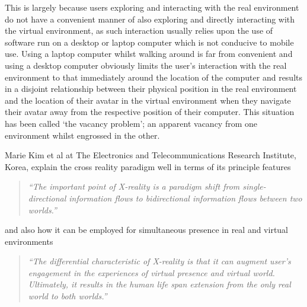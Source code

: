 This is largely because users exploring and interacting with the real environment do not have a convenient manner of also exploring and directly interacting with the virtual environment, as such interaction usually relies upon the use of software run on a desktop or laptop computer which is not conducive to mobile use. Using a laptop computer whilst walking around is far from convenient and using a desktop computer obviously limits the user's interaction with the real environment to that immediately around the location of the  computer and results in a disjoint relationship between their physical position in the real environment and the location of their avatar in the virtual environment when they navigate their avatar away from the respective position of their computer. This situation has been called `the vacancy problem'; an apparent vacancy from one environment whilst engrossed in the other.










Marie Kim et al at The Electronics and Telecommunications Research Institute, Korea, explain the cross reality paradigm well in terms of its principle features

\begin{quote}
\textit{``The important point of X-reality is a paradigm shift from single-directional information flows to bidirectional information flows between two worlds.''}
\end{quote}

and also how it can be employed for simultaneous presence in real and virtual environments

\begin{quote}
\textit{``The differential characteristic of X-reality is that it can augment user's engagement in the experiences of virtual presence and virtual world. Ultimately, it results in the human life span extension from the only real world to both worlds.''}
\end{quote}





